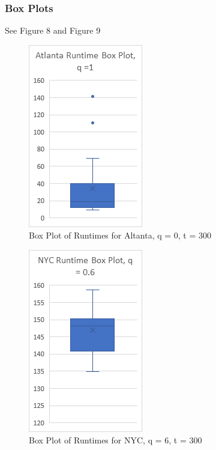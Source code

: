 \documentclass[sigconf]{acmart}
\begin{document}
\subsubsection{Box Plots}
See Figure 8 and Figure 9
\begin{figure}[h]
  \centering
  \includegraphics[width=5cm]{genetic_box_Atlanta.png}
  \caption{Box Plot of Runtimes for Altanta, q = 0, t = 300}
\end{figure}
\begin{figure}[h]
  \centering
  \includegraphics[width=5cm]{genetic_box_NYC.png}
  \caption{Box Plot of Runtimes for NYC, q = 6, t = 300}
\end{figure}

\end{document}
